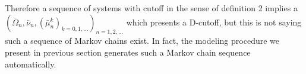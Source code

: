 \documentclass{article}
\begin{document}
Therefore a sequence of systems with cutoff in the sense of definition 2 implies a $(\bar{\Omega}_n,\bar{\nu}_n,(\bar{\mu}_n^k)_{k=0,1,...} )_{n=1,2,...}$ which presents a D-cutoff, but this is not saying such a sequence of Markov chains exist. In fact, the modeling procedure we present in previous section generates such a Markov chain sequence automatically. 






       
\end{document}
